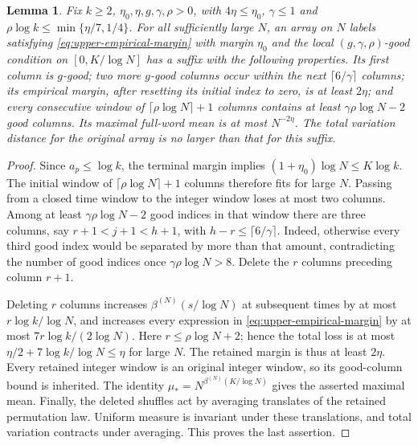 \documentclass[11pt]{article}
\numberwithin{equation}{section}
\newtheorem{lemma}[theorem]{Lemma}
\theoremstyle{definition}
\theoremstyle{remark}
\newcommand{\1}{\mathbf 1}
\begin{document}
\begin{lemma}%
\label{lem:upper-restart}
Fix $k\ge2$, $\eta_0,\eta,g,\gamma,\rho>0$, with
$4\eta\le\eta_0$, $\gamma\le1$ and
$\rho\log k\le\min\{\eta/7,1/4\}$.
For all sufficiently large $N$, an array on $N$ labels satisfying
\eqref{eq:upper-empirical-margin} with margin $\eta_0$ and the local
$(g,\gamma,\rho)$-good condition on $[0,K/\log N]$ has a suffix
with the following properties. Its first column is $g$-good; two more
$g$-good columns occur within the next $\lceil6/\gamma\rceil$ columns;
its empirical margin, after resetting its initial index to zero, is
at least $2\eta$; and every consecutive window of
$\lceil\rho\log N\rceil+1$ columns contains at least
$\gamma\rho\log N-2$ good columns. Its maximal full-word mean is at
most $N^{-2\eta}$. The total variation distance for the original array
is no larger than that for this suffix.
\end{lemma}
\begin{proof}
Since $a_p\le\log k$, the terminal margin implies
$(1+\eta_0)\log N\le K\log k$. The initial window of
$\lceil\rho\log N\rceil+1$ columns therefore fits for large $N$.
Passing from a closed time window to the integer window loses at most
two columns. Among at least $\gamma\rho\log N-2$ good indices in
that window there are three columns, say $r+1<j+1<h+1$, with
$h-r\le\lceil6/\gamma\rceil$. Indeed, otherwise every third good
index would be separated by more than that amount, contradicting
the number of good indices once $\gamma\rho\log N>8$.
Delete the $r$ columns preceding column $r+1$.

Deleting $r$ columns increases $\beta^{(N)}(s/\log N)$ at subsequent times
by at most $r\log k/\log N$, and increases every expression in
\eqref{eq:upper-empirical-margin} by at most
$7r\log k/(2\log N)$. Here $r\le\rho\log N+2$; hence the total
loss is at most $\eta/2+7\log k/\log N\le\eta$ for large $N$.
The retained margin is thus at least $2\eta$. Every retained integer
window is an original integer window, so its good-column bound is
inherited. The identity
$\mu_*=N^{\beta^{(N)}(K/\log N)}$ gives the asserted maximal mean.
Finally, the deleted shuffles act by averaging translates of the
retained permutation law. Uniform measure is invariant under these
translations, and total variation contracts under averaging. This
proves the last assertion.
\end{proof}
\end{document}
